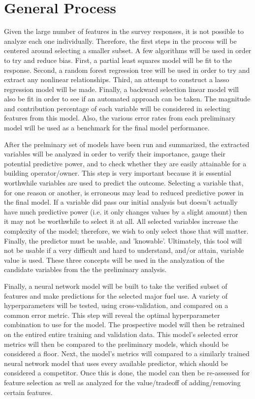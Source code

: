 {\section*{General Process}}

Given the large number of features in the survey responses, it is not possible to analyze each one individually.  Therefore, the first steps in the process will be centered around selecting a smaller subset.  A few algorithms will be used in order to try and reduce bias.  First, a partial least squares model will be fit to the response.  Second, a random forest regression tree will be used in order to try and extract any nonlinear relationships.  Third, an attempt to construct a lasso regression model will be made.  Finally, a backward selection linear model will also be fit in order to see if an automated approach can be taken.  The magnitude and contribution percentage of each variable will be considered in selecting features from this model.  Also, the various error rates from each preliminary model will be used as a benchmark for the final model performance.

After the prelminary set of models have been run and summarized, the extracted variables will be analyzed in order to verify their importance, gauge their potential predictive power, and to check whether they are easily attainable for a building operator/owner.  This step is very important because it is essential worthwhile variables are used to predict the outcome.  Selecting a variable that, for one reason or another, is erroneous may lead to reduced predictive power in the final model.  If a variable did pass our initial analysis but doesn't actually have much predictive power (i.e. it only changes values by a slight amount) then it may not be worthwhile to select it at all.  All selected variables increase the complexity of the model; therefore, we wish to only select those that will matter.  Finally, the predictor must be usable, and 'knowable'.  Ultimately, this tool will not be usable if a very difficult and hard to understand, and/or attain, variable value is used.  These three concepts will be used in the analyzation of the candidate variables from the the preliminary analysis. 

Finally, a neural network model will be built to take the verified subset of features and make predictions for the selected major fuel use.  A variety of hyperparameters will be tested, using cross-validation, and compared on a common error metric.  This step will reveal the optimal hyperparameter combination to use for the model.  The prospective model will then be retrained on the entired entire training and validation data.  This model's selected error metrics will then be compared to the preliminary models, which should be considered a floor.  Next, the model's metrics will compared to a similarly trained neural network model that uses every available predictor, which should be considered a competitor.  Once this is done, the model can then be re-assessed for feature selection as well as analyzed for the value/tradeoff of adding/removing certain features.